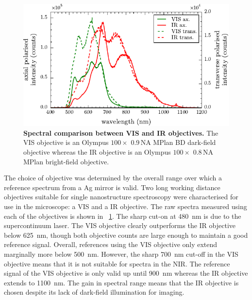 \documentclass{article}
\begin{document}
\begin{figure}[h]
\centering
\includegraphics{figures/objective_comparison}
\caption*
{\textbf{Spectral comparison between VIS and IR objectives.} The VIS objective is an Olympus $100\times$ 0.9\,NA MPlan BD dark-field objective whereas the IR objective is an Olympus $100\times$ 0.8\,NA MPlan bright-field objective.}
\label{fig:objective_comparison}
\end{figure}

The choice of objective was determined by the overall range over which a reference spectrum from a Ag mirror is valid. Two long working distance objectives suitable for single nanostructure spectroscopy were characterised for use in the microscope: a VIS and a IR objective. The raw spectra measured using each of the objectives is shown in \figurename~\ref{fig:objective_comparison}. The sharp cut-on at \SI{480}{nm} is due to the supercontinuum laser. The VIS objective clearly outperforms the IR objective below \SI{625}{nm}, though both objective counts are large enough to maintain a good reference signal. Overall, references using the VIS objective only extend marginally more below \SI{500}{nm}. However, the sharp \SI{700}{nm} cut-off in the VIS objective means that it is not suitable for spectra in the NIR. The reference signal of the VIS objective is only valid up until \SI{900}{nm} whereas the IR objective extends to \SI{1100}{nm}. The gain in spectral range means that the IR objective is chosen despite its lack of dark-field illumination for imaging.
\end{document}
